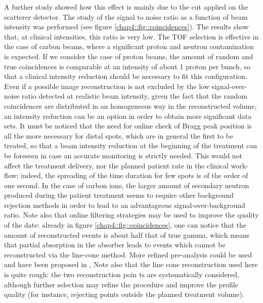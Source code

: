A further study showed how this effect is mainly due to the cut applied on the scatterer detector. 
The study of the signal to noise ratio as a function of beam intensity was performed (see figure \ref{chap4::fig::coincidences}). The results show that, at clinical intensities, this ratio is very low. The TOF selection is effective in the case of carbon beams, where a significant proton and neutron contamination is expected. If we consider the case of proton beams, the amount of random and true coincidences is comparable at an intensity of about 1 proton per bunch, so that a clinical intensity reduction should be necessary to fit this configuration. Even if a possible image reconstruction is not excluded by the low signal-over-noise ratio detected at realistic beam intensity, given the fact that the random coincidences are distributed in an homogeneous way in the reconstructed volume, an intensity reduction can be an option in order to obtain more significant data sets. It must be noticed that the need for online check of Bragg peak position is all the more necessary for distal spots, which are in general the first to be treated, so that a beam intensity reduction at the beginning of the treatment can be foreseen in case an accurate monitoring is strictly needed. This would not affect the treatment delivery, nor the planned patient rate in the clinical work-flow; indeed, the spreading of the time duration for few spots is of the order of one second. 
In the case of carbon ions, the larger amount of secondary neutron produced during the patient treatment seems to require other background rejection methods in order to lead to an advantageous signal-over-background ratio. Note also that online filtering strategies  may be used to improve the quality of the date: already in figure \ref{chap4::fig::coincidences}, one can notice that the amount of reconstructed events is about half that of true gamma, which means that partial absorption in the absorber leads to events which cannot be reconstructed via the line-cone method. More refined pre-analysis could be used and have been proposed in \cite{Draeger2017}, Note also that the line cone reconstruction used here is quite rough: the two reconstruction poin ts are systematically considered, although further selection may refine the procedure and improve the profile quality (for instance, rejecting points outside the planned treatment volume).

